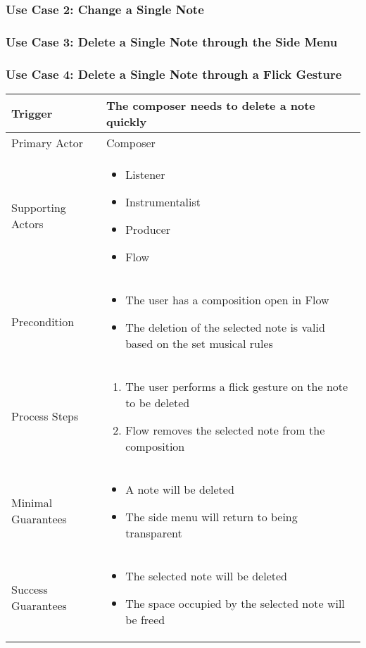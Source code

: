 
\subsubsection{Use Case 2: Change a Single Note}


\subsubsection{Use Case 3: Delete a Single Note through the Side Menu}


\subsubsection{Use Case 4: Delete a Single Note through a Flick Gesture}

\begin{tabularx}{\textwidth}{|X|X|}
\hline
Trigger & 
The composer needs to delete a note quickly \\
\hline
Primary Actor & 
Composer\\
\hline
Supporting Actors & 
\begin{itemize}
\item Listener
\item Instrumentalist
\item Producer
\item Flow
\end{itemize} \\
\hline
Precondition & 
\begin{itemize}
\item The user has a composition open in Flow 
\item The deletion of the selected note is valid based on the set musical rules
\end{itemize} \\
\hline
Process Steps & 
\begin{enumerate}
\item The user performs a flick gesture on the note to be deleted
\item Flow removes the selected note from the composition
\end{enumerate} \\
\hline
Minimal Guarantees & 
\begin{itemize}
  \item A note will be deleted
  \item The side menu will return to being transparent
\end{itemize} \\
\hline
Success Guarantees & 
\begin{itemize}
  \item The selected note will be deleted
  \item The space occupied by the selected note will be freed
\end{itemize} \\
\hline
\end{tabularx}

